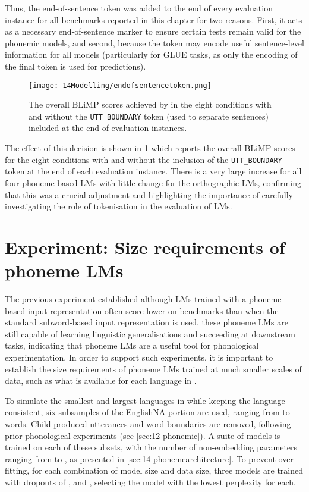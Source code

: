 Thus, the end-of-sentence token was added to the end of every evaluation instance for all benchmarks reported in this chapter for two reasons. First, it acts as a necessary end-of-sentence marker to ensure certain tests remain valid for the phonemic models, and second, because the token may encode useful sentence-level information for all models (particularly for GLUE tasks, as only the encoding of the final token is used for predictions).

\begin{figure}[t]
    \centering
    \texttt{[image: 14Modelling/endofsentencetoken.png]}
    \caption{The overall BLiMP scores achieved by \gpt in the eight conditions with and without the \texttt{UTT\_BOUNDARY} token (used to separate sentences) included at the end of evaluation instances.}
    \label{fig:14-endofsentencetoken}
\end{figure}

The effect of this decision is shown in \cref{fig:14-endofsentencetoken} which reports the overall BLiMP scores for the eight conditions with and without the inclusion of the \texttt{UTT\_BOUNDARY} token at the end of each evaluation instance. There is a very large increase for all four phoneme-based LMs with little change for the orthographic LMs, confirming that this was a crucial adjustment and highlighting the importance of carefully investigating the role of tokenisation in the evaluation of LMs.

\section{Experiment: Size requirements of phoneme LMs}\label{sec:14-sizerequirements}

The previous experiment established although LMs trained with a phoneme-based input representation often score lower on benchmarks than when the standard subword-based input representation is used, these phoneme LMs are still capable of learning linguistic generalisations and succeeding at downstream tasks, indicating that phoneme LMs are a useful tool for phonological experimentation. In order to support such experiments, it is important to establish the size requirements of phoneme LMs trained at much smaller scales of data, such as what is available for each language in \ipachildes.

To simulate the smallest and largest languages in \ipachildes while keeping the language consistent, six subsamples of the EnglishNA portion are used, ranging from  to  words. Child-produced utterances and word boundaries are removed, following prior phonological experiments (see \cref{sec:12-phonemic}). A suite of \gpt models is trained on each of these subsets, with the number of non-embedding parameters ranging from  to , as presented in \cref{sec:14-phonemearchitecture}. To prevent over-fitting, for each combination of model size and data size, three models are trained with dropouts of ,  and , selecting the model with the lowest perplexity for each.



